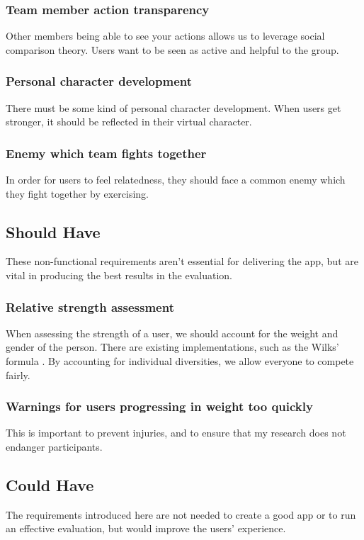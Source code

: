 \documentclass{l4proj}
\begin{document}
\subsubsection{Team member action transparency} 
Other members being able to see your actions allows us to leverage social comparison theory. Users want to be seen as active and helpful to the group.

\subsubsection{Personal character development}
There must be some kind of personal character development. When users get stronger, it should be reflected in their virtual character.

\subsubsection{Enemy which team fights together}
In order for users to feel relatedness, they should face a common enemy which they fight together by exercising.

\subsection{Should Have}
  These non-functional requirements aren't essential for delivering the app, but are vital in producing the best results in the evaluation.
  \subsubsection{Relative strength assessment}  
  When assessing the strength of a user, we should account for the weight and gender of the person. There are existing implementations, such as the Wilks' formula \citep{wilks}. By accounting for individual diversities, we allow everyone to compete fairly.

  \subsubsection{Warnings for users progressing in weight too quickly} 
  This is important to prevent injuries, and to ensure that my research does not endanger participants.

\subsection{Could Have}
  The requirements introduced here are not needed to create a good app or to run an effective evaluation, but would improve the users' experience.
\end{document}
